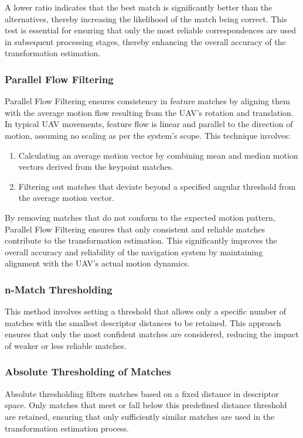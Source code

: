 A lower ratio indicates that the best match is significantly better than the alternatives, thereby increasing the likelihood of the match being correct. This test is essential for ensuring that only the most reliable correspondences are used in subsequent processing stages, thereby enhancing the overall accuracy of the transformation estimation.

\subsubsection*{Parallel Flow Filtering}

Parallel Flow Filtering ensures consistency in feature matches by aligning them with the average motion flow resulting from the UAV's rotation and translation. In typical UAV movements, feature flow is linear and parallel to the direction of motion, assuming no scaling as per the system's scope. This technique involves:

\begin{enumerate}
    \item Calculating an average motion vector by combining mean and median motion vectors derived from the keypoint matches. 
    \item Filtering out matches that deviate beyond a specified angular threshold from the average motion vector.
\end{enumerate}

By removing matches that do not conform to the expected motion pattern, Parallel Flow Filtering ensures that only consistent and reliable matches contribute to the transformation estimation. This significantly improves the overall accuracy and reliability of the navigation system by maintaining alignment with the UAV's actual motion dynamics.

\subsubsection*{n-Match Thresholding}
This method involves setting a threshold that allows only a specific number of matches with the smallest descriptor distances to be retained. This approach ensures that only the most confident matches are considered, reducing the impact of weaker or less reliable matches.

\subsubsection*{Absolute Thresholding of Matches}

Absolute thresholding filters matches based on a fixed distance in descriptor space. Only matches that meet or fall below this predefined distance threshold are retained, ensuring that only sufficiently similar matches are used in the transformation estimation process.

